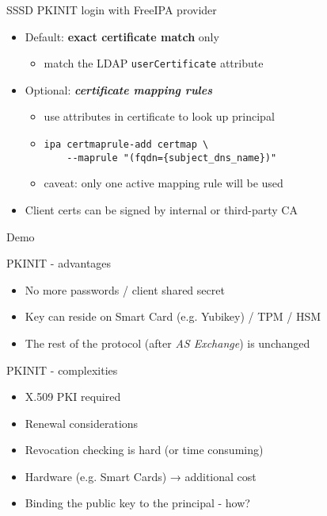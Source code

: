 \documentclass[ignorenonframetext,aspectratio=169,12pt]{beamer}
\begin{document}
\begin{frame}{SSSD PKINIT login with FreeIPA provider}
\protect\hypertarget{pkinit-in-freeipa}{}
\begin{itemize}
    \item Default: {\bf exact certificate match} only
        \begin{itemize}
            \item match the LDAP {\tt userCertificate} attribute
        \end{itemize}
    \item Optional: \textbf{\em certificate mapping rules}
        \begin{itemize}
            \item use attributes in certificate to look up principal
            \item {\tt ipa certmaprule-add certmap \textbackslash{} \\
                ~~~~{-}{-}maprule "(fqdn=\{subject\_dns\_name\})"}
            \item caveat: only one active mapping rule will be used
        \end{itemize}
    \item Client certs can be signed by internal or third-party CA
\end{itemize}
\end{frame}

\begin{frame}[plain]
\centering
\huge Demo
\end{frame}


\begin{frame}{PKINIT - advantages}
\protect\hypertarget{pkinit-advantages}{}
\begin{itemize}
    \item No more passwords / client shared secret
    \item Key can reside on Smart Card (e.g. Yubikey) / TPM / HSM
    \item The rest of the protocol (after {\em AS Exchange}) is unchanged
\end{itemize}
\end{frame}

\begin{frame}{PKINIT - complexities}
\protect\hypertarget{pkinit-complexities}{}
\begin{itemize}
    \item X.509 PKI required
    \item Renewal considerations
    \item Revocation checking is hard (or time consuming)
    \item Hardware (e.g. Smart Cards) → additional cost
    \item Binding the public key to the principal - how?
\end{itemize}
\end{frame}
\end{document}
